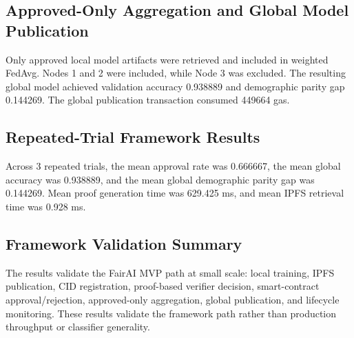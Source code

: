 \subsection{Approved-Only Aggregation and Global Model Publication}
Only approved local model artifacts were retrieved and included in weighted FedAvg. Nodes 1 and 2 were included, while Node 3 was excluded. The resulting global model achieved validation accuracy 0.938889 and demographic parity gap 0.144269. The global publication transaction consumed 449664 gas.

\subsection{Repeated-Trial Framework Results}
Across 3 repeated trials, the mean approval rate was 0.666667, the mean global accuracy was 0.938889, and the mean global demographic parity gap was 0.144269. Mean proof generation time was 629.425 ms, and mean IPFS retrieval time was 0.928 ms.

\subsection{Framework Validation Summary}
The results validate the FairAI MVP path at small scale: local training, IPFS publication, CID registration, proof-based verifier decision, smart-contract approval/rejection, approved-only aggregation, global publication, and lifecycle monitoring. These results validate the framework path rather than production throughput or classifier generality.
